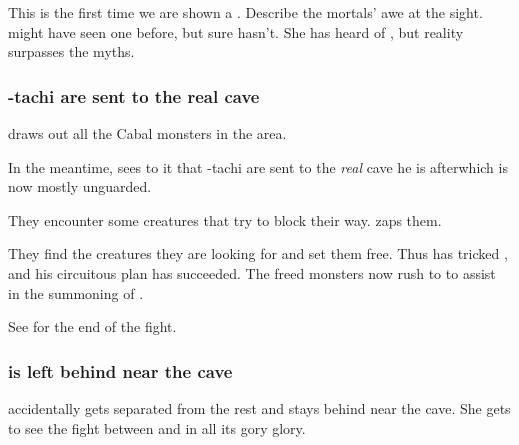 This is the first time we are shown a \dragon. 
Describe the mortals' awe at the sight. 
\Dzasselid{} might have seen one before, but \Shilred{} sure hasn't. 
She has heard  of \dragons{}, but reality surpasses the myths. 





\subsubsection{\Dzasselid-tachi are sent to the real cave}
\Ishnaruchaefir{} draws out all the Cabal monsters in the area. 

In the meantime, \Criseis{} sees to it that \Dzasselid-tachi are sent to the \emph{real} cave he is after\dash which is now mostly unguarded. 

They encounter some creatures that try to block their way. 
\Criseis{} zaps them.


They find the creatures they are looking for and set them free. Thus \Ishnaruchaefir{} has tricked \Teshrial{}, and his circuitous plan has succeeded. The freed monsters now rush to \Malcur to assist in the summoning of \Nithdornazsh. 

See  for the end of the fight.






\subsubsection{\Shilred{} is left behind near the cave}
\Shilred{} accidentally gets separated from the rest and stays behind near the cave. 
She gets to see the fight between \Ishnaruchaefir{} and \Teshrial{} in all its gory glory. 
















